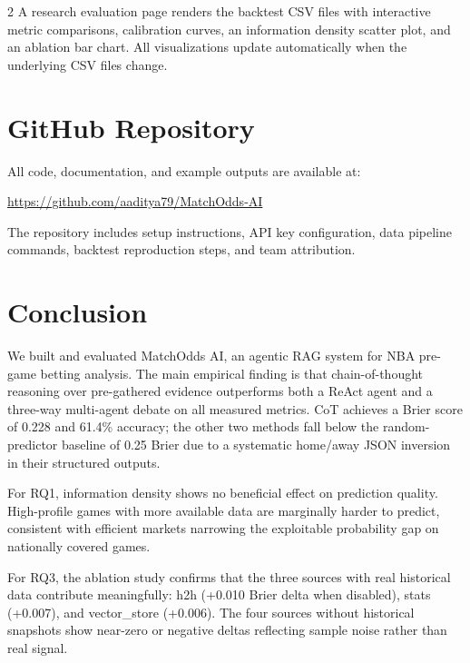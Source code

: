 \documentclass[11pt]{article}
\begin{document}
\begin{multicols}{2}
A research evaluation page renders the backtest CSV files with interactive metric comparisons, calibration curves, an information density scatter plot, and an ablation bar chart. All visualizations update automatically when the underlying CSV files change.

\section{GitHub Repository}

All code, documentation, and example outputs are available at:

\begin{center}
\url{https://github.com/aaditya79/MatchOdds-AI}
\end{center}

The repository includes setup instructions, API key configuration, data pipeline commands, backtest reproduction steps, and team attribution.

\section{Conclusion}

We built and evaluated MatchOdds AI, an agentic RAG system for NBA pre-game betting analysis. The main empirical finding is that chain-of-thought reasoning over pre-gathered evidence outperforms both a ReAct agent and a three-way multi-agent debate on all measured metrics. CoT achieves a Brier score of 0.228 and 61.4\% accuracy; the other two methods fall below the random-predictor baseline of 0.25 Brier due to a systematic home/away JSON inversion in their structured outputs.

For RQ1, information density shows no beneficial effect on prediction quality. High-profile games with more available data are marginally harder to predict, consistent with efficient markets narrowing the exploitable probability gap on nationally covered games.

For RQ3, the ablation study confirms that the three sources with real historical data contribute meaningfully: h2h (+0.010 Brier delta when disabled), stats (+0.007), and vector\_store (+0.006). The four sources without historical snapshots show near-zero or negative deltas reflecting sample noise rather than real signal.


\end{multicols}
\end{document}
